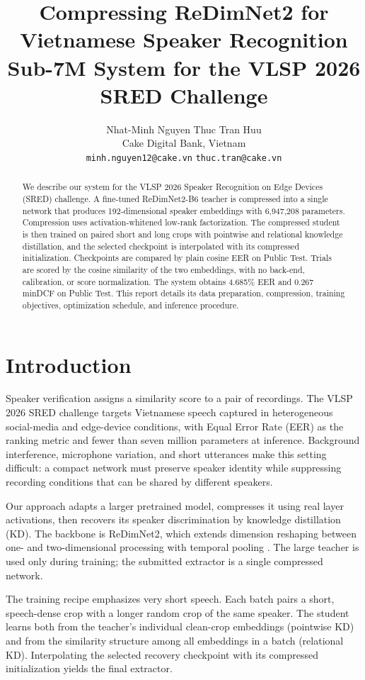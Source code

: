 \documentclass[11pt]{article}
\title{Compressing ReDimNet2 for Vietnamese Speaker Recognition\\ Sub-7M System for the VLSP 2026 SRED Challenge}
\author{Nhat-Minh Nguyen \qquad Thuc Tran Huu \\
Cake Digital Bank, Vietnam \\
\texttt{minh.nguyen12@cake.vn} \quad \texttt{thuc.tran@cake.vn}}
\begin{document}
\maketitle
\begin{abstract}
We describe our system for the VLSP 2026 Speaker Recognition on Edge Devices (SRED) challenge. A fine-tuned ReDimNet2-B6 teacher is compressed into a single network that produces 192-dimensional speaker embeddings with 6,947,208 parameters. Compression uses activation-whitened low-rank factorization. The compressed student is then trained on paired short and long crops with pointwise and relational knowledge distillation, and the selected checkpoint is interpolated with its compressed initialization. Checkpoints are compared by plain cosine EER on Public Test. Trials are scored by the cosine similarity of the two embeddings, with no back-end, calibration, or score normalization. The system obtains 4.685\% EER and 0.267 minDCF on Public Test. This report details its data preparation, compression, training objectives, optimization schedule, and inference procedure.
\end{abstract}

\section{Introduction}
Speaker verification assigns a similarity score to a pair of recordings. The VLSP 2026 SRED challenge targets Vietnamese speech captured in heterogeneous social-media and edge-device conditions, with Equal Error Rate (EER) as the ranking metric and fewer than seven million parameters at inference. Background interference, microphone variation, and short utterances make this setting difficult: a compact network must preserve speaker identity while suppressing recording conditions that can be shared by different speakers.

Our approach adapts a larger pretrained model, compresses it using real layer activations, then recovers its speaker discrimination by knowledge distillation (KD). The backbone is ReDimNet2, which extends dimension reshaping between one- and two-dimensional processing with temporal pooling \citep{yakovlev2026redimnet2}. The large teacher is used only during training; the submitted extractor is a single compressed network.

The training recipe emphasizes very short speech. Each batch pairs a short, speech-dense crop with a longer random crop of the same speaker. The student learns both from the teacher's individual clean-crop embeddings (pointwise KD) and from the similarity structure among all embeddings in a batch (relational KD). Interpolating the selected recovery checkpoint with its compressed initialization yields the final extractor.
\end{document}
